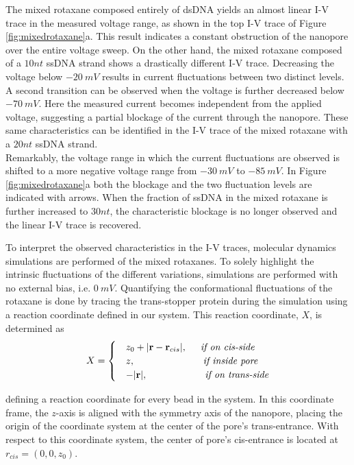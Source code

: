 The mixed rotaxane composed entirely of dsDNA yields an almost linear I-V trace in the
measured voltage range, as shown in the top I-V trace of Figure \ref{fig:mixedrotaxane}a.
This result indicates a constant obstruction of the nanopore over
the entire voltage sweep. On the other hand, the mixed rotaxane composed of a $10nt$
ssDNA strand shows a drastically different I-V trace. Decreasing the voltage below
$-20\ mV$ results in current fluctuations between two distinct levels. A second
transition
can be observed when the voltage is further decreased below $-70\ mV$. Here the measured
current becomes independent from the applied voltage, suggesting a partial blockage of
the current through the nanopore. These same characteristics can be identified in the I-V
trace of the mixed rotaxane with a $20nt$ ssDNA strand.\\

Remarkably, the voltage range
in which the current fluctuations are observed is shifted to a more negative
voltage range from $-30\ mV$ to  $-85\ mV$. In Figure \ref{fig:mixedrotaxane}a both the
blockage and the two fluctuation levels are indicated with arrows. When the fraction of
ssDNA in the mixed rotaxane is further increased to $30nt$, the characteristic blockage
is no longer observed and the linear I-V trace is recovered.


To interpret the observed characteristics in the I-V traces, molecular dynamics
simulations are performed of the mixed rotaxanes. To solely highlight the intrinsic
fluctuations of the different variations, simulations are performed with no
external bias, i.e. $0\ mV$. Quantifying
the conformational fluctuations of the rotaxane is done by tracing the trans-stopper
protein during the simulation using a reaction coordinate defined in our system. This
reaction coordinate, $X$, is determined as
\begin{equation}
  X = \begin{cases}
        &z_0 + |\textbf{r} - \textbf{r}_{cis}|, \hspace{0.5cm} \textit{if on cis-side}\\
        &z, \hspace{2.5cm} \textit{if inside pore}\\
        &-|\textbf{r}|, \hspace{2.11cm} \textit{if on trans-side}
      \end{cases}
      \label{eq:reaction}
\end{equation}

defining a reaction coordinate for every bead in the system. In this coordinate frame,
the $z$-axis is aligned with the symmetry axis of the nanopore, placing the origin of
the coordinate system at the center of the pore's trans-entrance. With respect to this
coordinate system, the center of pore's cis-entrance is located at $r_{cis} = (0,0,z_0)$.


